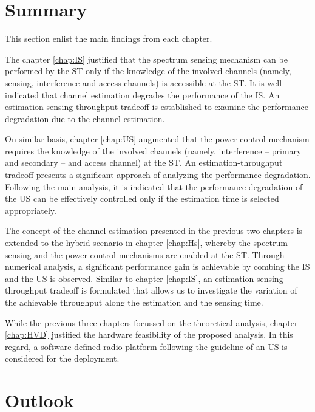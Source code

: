 \section{Summary}

This section enlist the main findings from each chapter. 

The chapter \ref{chap:IS} justified that the spectrum sensing mechanism can be performed by the ST only if the knowledge of the involved channels (namely, sensing, interference and access channels) is accessible at the ST. It is well indicated that channel estimation degrades the performance of the IS. An estimation-sensing-throughput tradeoff is established to examine the performance degradation due to the channel estimation.

On similar basis, chapter \ref{chap:US} augmented that the power control mechanism requires the knowledge of the involved channels (namely, interference -- primary and secondary -- and access channel) at the ST. An estimation-throughput tradeoff presents a significant approach of analyzing the performance degradation. Following the main analysis, it is indicated that the performance degradation of the US can be effectively controlled only if the estimation time is selected appropriately.   

The concept of the channel estimation presented in the previous two chapters is extended to the hybrid scenario in chapter \ref{chap:Hs}, whereby the spectrum sensing and the power control mechanisms are enabled at the ST. Through numerical analysis, a significant performance gain is achievable by combing the IS and the US is observed. Similar to chapter \ref{chap:IS}, an estimation-sensing-throughput tradeoff is formulated that allows us to investigate the variation of the achievable throughput along the estimation and the sensing time. 

While the previous three chapters focussed on the theoretical analysis, chapter \ref{chap:HVD} justified the hardware feasibility of the proposed analysis. In this regard, a software defined radio platform following the guideline of an US is considered for the deployment. 


\section{Outlook}











